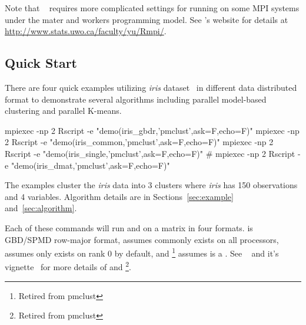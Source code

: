 Note that ~\citep{Yu2010}
requires more complicated settings for running on
some MPI systems under the mater and workers programming model.
See 's website for details at
\url{http://www.stats.uwo.ca/faculty/yu/Rmpi/}.




\subsection[Quick Start]{Quick Start}
\label{sec:quick}

There are four quick examples utilizing {\it iris} dataset~\citep{Fisher1936}
in different data distributed format to demonstrate several algorithms
including parallel model-based clustering and parallel K-means.
\begin{Command}
mpiexec -np 2 Rscript -e "demo(iris_gbdr,'pmclust',ask=F,echo=F)"
mpiexec -np 2 Rscript -e "demo(iris_common,'pmclust',ask=F,echo=F)"
mpiexec -np 2 Rscript -e "demo(iris_single,'pmclust',ask=F,echo=F)"
# mpiexec -np 2 Rscript -e "demo(iris_dmat,'pmclust',ask=F,echo=F)"
\end{Command}
The examples cluster the {\it iris} data into 3 clusters where
{\it iris} has 150 observations and 4 variables.
Algorithm details are in Sections~\ref{sec:example} and~\ref{sec:algorithm}.

Each of these commands will run  and  on
a matrix  in four formats.
 is GBD/SPMD row-major format,
 assumes  commonly exists on all processors,
 assumes  only exists on rank 0 by default, and
\footnote{Retired from pmclust}
assumes  is a .
See ~\citep{Schmidt2013pbdDEMOpackage} and it's
vignette~\citep{Schmidt2013pbdDEMOvignette}
for more details of  and
\footnote{Retired from pmclust}.

